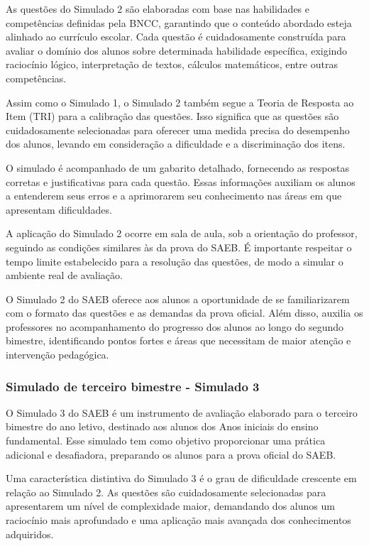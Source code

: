 As questões do Simulado 2 são elaboradas com base nas habilidades e
competências definidas pela BNCC, garantindo que o conteúdo abordado
esteja alinhado ao currículo escolar. Cada questão é cuidadosamente
construída para avaliar o domínio dos alunos sobre determinada
habilidade específica, exigindo raciocínio lógico, interpretação de
textos, cálculos matemáticos, entre outras competências.

Assim como o Simulado 1, o Simulado 2 também segue a Teoria de Resposta
ao Item (TRI) para a calibração das questões. Isso significa que as
questões são cuidadosamente selecionadas para oferecer uma medida
precisa do desempenho dos alunos, levando em consideração a dificuldade
e a discriminação dos itens.

O simulado é acompanhado de um gabarito detalhado, fornecendo as
respostas corretas e justificativas para cada questão. Essas informações
auxiliam os alunos a entenderem seus erros e a aprimorarem seu
conhecimento nas áreas em que apresentam dificuldades.

A aplicação do Simulado 2 ocorre em sala de aula, sob a orientação do
professor, seguindo as condições similares às da prova do SAEB. É
importante respeitar o tempo limite estabelecido para a resolução das
questões, de modo a simular o ambiente real de avaliação.

O Simulado 2 do SAEB oferece aos alunos a oportunidade de se
familiarizarem com o formato das questões e as demandas da prova
oficial. Além disso, auxilia os professores no acompanhamento do
progresso dos alunos ao longo do segundo bimestre, identificando pontos
fortes e áreas que necessitam de maior atenção e intervenção pedagógica.

\subsubsection{Simulado de terceiro bimestre - Simulado
3}\label{simulado-de-terceiro-bimestre---simulado-3}

O Simulado 3 do SAEB é um instrumento de avaliação elaborado para o
terceiro bimestre do ano letivo, destinado aos alunos dos Anos iniciais
do ensino fundamental. Esse simulado tem como objetivo proporcionar uma
prática adicional e desafiadora, preparando os alunos para a prova
oficial do SAEB.

Uma característica distintiva do Simulado 3 é o grau de dificuldade
crescente em relação ao Simulado 2. As questões são cuidadosamente
selecionadas para apresentarem um nível de complexidade maior,
demandando dos alunos um raciocínio mais aprofundado e uma aplicação
mais avançada dos conhecimentos adquiridos.

